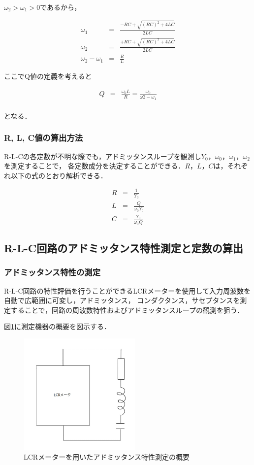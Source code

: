 \documentclass[dvipdfmx,titlepage,a4j]{jsarticle}  %
\numberwithin{equation}{section}
\begin{document}
$\omega_2 > \omega_1 > 0$であるから，

\begin{eqnarray}
  \omega_1 &=& \frac{-RC + \sqrt{(RC)^2 + 4LC}}{2LC} \\
  \omega_2 &=& \frac{+RC + \sqrt{(RC)^2 + 4LC}}{2LC} \\
  \omega_2 - \omega_1 &=& \frac{R}{L}
\end{eqnarray}

ここでQ値の定義を考えると

\begin{eqnarray}
  Q &=& \frac{\omega_0 L}{R} = \frac{\omega_0}{\omega2 - \omega_1}\\
\end{eqnarray}

となる．

\subsubsection{R, L, C値の算出方法}
R-L-Cの各定数が不明な際でも，アドミッタンスループを観測し$Y_0$，$\omega_0$，$\omega_1$，$\omega_2$を測定することで，
各定数成分を決定することができる．$R$，$L$，$C$は，それぞれ以下の式のとおり解析できる．

\begin{eqnarray}
  R &=& \frac{1}{Y_0} \\
  L &=& \frac{Q}{\omega_0 Y_0} \\
  C &=& \frac{Y_0}{\omega_0 Q}
\end{eqnarray}

\subsection{R-L-C回路のアドミッタンス特性測定と定数の算出}

\subsubsection{アドミッタンス特性の測定}
R-L-C回路の特性評価を行うことができるLCRメーターを使用して入力周波数を自動で広範囲に可変し，アドミッタンス，
コンダクタンス，サセプタンスを測定することで，回路の周波数特性およびアドミッタンスループの観測を狙う．

図\ref{fig:fig7-meter.jpg}に測定機器の概要を図示する．
\begin{figure}[H]
  \centering
  \includegraphics[width=6cm]{../fig/fig7-meter.jpg}
  \caption{LCRメーターを用いたアドミッタンス特性測定の概要}
  \label{fig:fig7-meter.jpg}
\end{figure}
\end{document}
